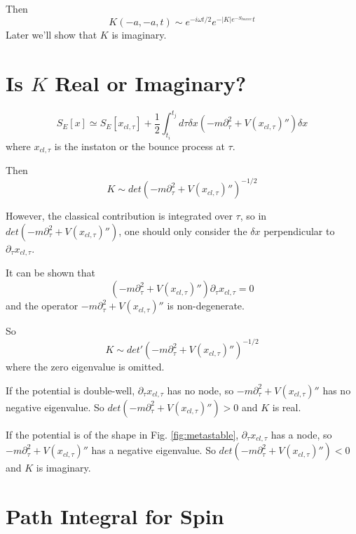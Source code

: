 \documentclass[12pt]{book}
\begin{document}
	Then
	\begin{equation}
		K(-a,-a,t)\sim e^{-i\omega t/2}e^{-|K|e^{-S_{bounce}}t}
	\end{equation}
	Later we'll show that $K$ is imaginary.
	
	\section{Is $K$ Real or Imaginary?}
	
	\begin{equation}
		S_E[x]\simeq S_E[x_{cl,\tau}]+\frac 12\int_{t_i}^{t_j}d\tau \delta x(- m\partial_\tau^2+V(x_{cl,\tau})'')\delta x
	\end{equation}
	where $x_{cl,\tau}$ is the instaton or the bounce process at $\tau$.
	
	Then
	\begin{equation}
		K\sim det(-m\partial_\tau^2+V(x_{cl,\tau})'')^{-1/2}
	\end{equation}
	
	However, the classical contribution is integrated over $\tau$, so in $det(-m\partial_\tau^2+V(x_{cl,\tau})'')$, one should only consider the $\delta x$ perpendicular to $\partial_\tau x_{cl,\tau}$. 
	
	It can be shown that 
	\begin{equation}
		(-m\partial_\tau^2+V(x_{cl,\tau})'')\partial_\tau x_{cl,\tau}=0
	\end{equation}
	and the operator $-m\partial_\tau^2+V(x_{cl,\tau})''$ is non-degenerate.
	
	So
	\begin{equation}
		K\sim det'(-m\partial_\tau^2+V(x_{cl,\tau})'')^{-1/2}
	\end{equation}
	where the zero eigenvalue is omitted.
	
	If the potential is double-well, $\partial_\tau x_{cl,\tau}$ has no node, so $-m\partial_\tau^2+V(x_{cl,\tau})''$ has no negative eigenvalue. So $det(-m\partial_\tau^2+V(x_{cl,\tau})'')>0$ and $K$ is real.
	
	If the potential is of the shape in Fig. \ref{fig:metastable}, $\partial_\tau x_{cl,\tau}$ has a node, so $-m\partial_\tau^2+V(x_{cl,\tau})''$ has a negative eigenvalue. So $det(-m\partial_\tau^2+V(x_{cl,\tau})'')<0$ and $K$ is imaginary.
	
	\section{Path Integral for Spin}
	
\end{document}
